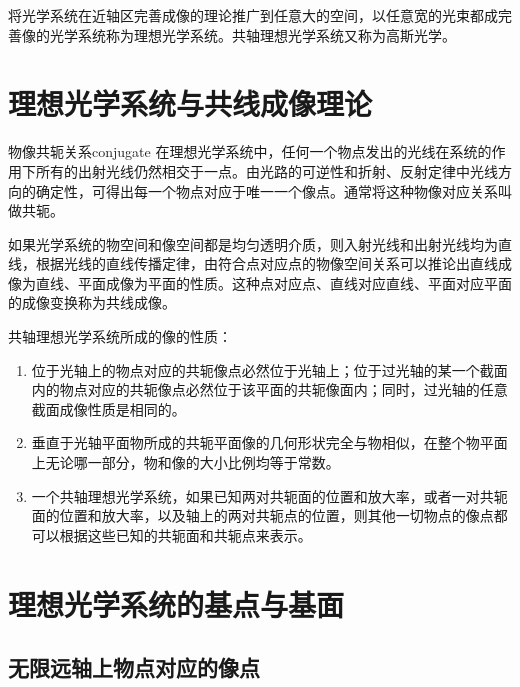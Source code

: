 \documentclass[cn,10pt,chinesefont=founder,math=newtx,cite=super,twoside]{elegantbook}
\begin{document}
将光学系统在近轴区完善成像的理论推广到任意大的空间，以任意宽的光束都成完善像的光学系统称为理想光学系统。共轴理想光学系统又称为高斯光学。

\section{理想光学系统与共线成像理论}

\begin{definition}{物像共轭关系}{conjugate}
	在理想光学系统中，任何一个物点发出的光线在系统的作用下所有的出射光线仍然相交于一点。由光路的可逆性和折射、反射定律中光线方向的确定性，可得出每一个物点对应于唯一一个像点。通常将这种物像对应关系叫做共轭。
\end{definition}

如果光学系统的物空间和像空间都是均匀透明介质，则入射光线和出射光线均为直线，根据光线的直线传播定律，由符合点对应点的物像空间关系可以推论出直线成像为直线、平面成像为平面的性质。这种点对应点、直线对应直线、平面对应平面的成像变换称为共线成像。

\begin{property}
共轴理想光学系统所成的像的性质：
\begin{enumerate}
	\item 位于光轴上的物点对应的共轭像点必然位于光轴上；位于过光轴的某一个截面内的物点对应的共轭像点必然位于该平面的共轭像面内；同时，过光轴的任意截面成像性质是相同的。
	\item 垂直于光轴平面物所成的共轭平面像的几何形状完全与物相似，在整个物平面上无论哪一部分，物和像的大小比例均等于常数。
	\item 一个共轴理想光学系统，如果已知两对共轭面的位置和放大率，或者一对共轭面的位置和放大率，以及轴上的两对共轭点的位置，则其他一切物点的像点都可以根据这些已知的共轭面和共轭点来表示。
\end{enumerate}
\end{property}

\section{理想光学系统的基点与基面}
\subsection{无限远轴上物点对应的像点}
\label{subsect:infty-object}
\end{document}
